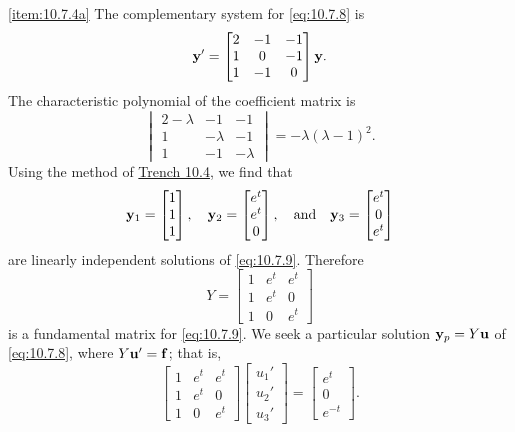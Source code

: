 \documentclass{ximera}
\begin{document}
\begin{example}
\begin{explanation}\ref{item:10.7.4a} 
The complementary system for \eqref{eq:10.7.8} is
\begin{equation} \label{eq:10.7.9}
{\bf y}'=\begin{bmatrix}2&-1&-1\\1&0&-1\\1&-1&0\end{bmatrix}{\bf y}.
\end{equation}
The characteristic polynomial of the coefficient matrix is
$$
\begin{vmatrix}2-\lambda&-1&-1\\1&-\lambda&-1\\1&-1&-\lambda
\end{vmatrix}=
-\lambda(\lambda-1)^2.
$$
Using the method of \href{https://ximera.osu.edu/ode/main/constCoeffHomSysI/constCoeffHomSysI}{Trench 10.4}, we find that
$$
{\bf y}_1=\begin{bmatrix}1\\1\\1\end{bmatrix},\quad
{\bf y}_2=\begin{bmatrix}e^t\\e^t\\0\end{bmatrix},
\quad\mbox{and}\quad
{\bf y}_3=\begin{bmatrix}e^t\\0\\e^t\end{bmatrix}
$$
are linearly independent solutions of \eqref{eq:10.7.9}.
Therefore
$$
Y=\begin{bmatrix}1&e^t&e^t\\1&e^t&0\\1&0&e^t\end{bmatrix}
$$
is a fundamental matrix for  \eqref{eq:10.7.9}.
We seek a particular solution  ${\bf y}_p=Y{\bf u}$ of
\eqref{eq:10.7.8}, where
$Y{\bf u}'={\bf f}$; that is,
$$
\begin{bmatrix}1&e^t&e^t\\1&e^t&0\\1&0&e^t\end{bmatrix}
\begin{bmatrix}u_1'\\u_2'\\u_3'\end{bmatrix}=
\begin{bmatrix}e^t\\0\\e^{-t}\end{bmatrix}.
$$
\end{explanation}
\end{example}
\end{document}
